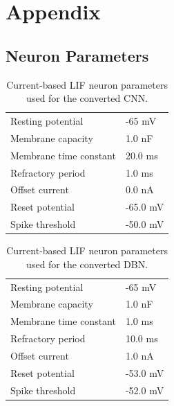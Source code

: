 \chapter{Appendix }

\section{Neuron Parameters}

\begin{table}[h!]
\caption{Current-based LIF neuron parameters used for the converted CNN.}
\centering
\label{cnnlifparam}
\begin{tabularx}{0.65\textwidth}{|XX|}
\hline
Resting potential    		& -65 mV 		    \\
Membrane capacity    		& 1.0 nF 		     \\
Membrane time constant    	& 20.0 ms		             \\
Refractory period     		& 1.0 ms		                 \\
Offset current    			& 0.0 nA		              \\
Reset potential     		& -65.0 mV 	               \\
Spike threshold     		& -50.0 mV          \\\hline
\end{tabularx}
\end{table}

\begin{table}[h!]
\caption{Current-based LIF neuron parameters used for the converted DBN.}
\centering
\label{cubalifparam}
\begin{tabularx}{0.65\textwidth}{|XX|}
\hline
Resting potential    		& -65 mV 		    \\
Membrane capacity    		& 1.0 nF 		     \\
Membrane time constant    	& 1.0 ms		             \\
Refractory period     		& 10.0 ms		                 \\
Offset current    			& 1.0 nA		              \\
Reset potential     		& -53.0 mV 	               \\
Spike threshold     		& -52.0 mV          \\\hline
\end{tabularx}
\end{table}


